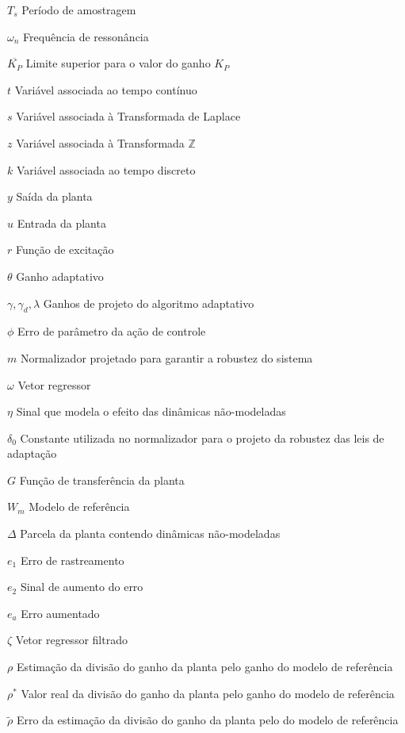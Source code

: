 \documentclass[12pt,
              openright,
              twoside,
              a4paper,
              english,
              french,
              spanish,
              sumario=tradicional,
              brazil
              ]{abntex2}
\begin{document}
\begin{simbolos}
 \item[$ T_s $] Período de amostragem
 \item[$ \omega_n $] Frequência de ressonância
 \item[$ \overline{K_P} $] Limite superior para o valor do ganho $K_P$
 \item[$ t $] Variável associada ao tempo contínuo
 \item[$ s $] Variável associada à Transformada de Laplace
 \item[$ z $] Variável associada à Transformada $\mathbb{Z}$
 \item[$ k $] Variável associada ao tempo discreto
 \item[$ y $] Saída da planta
 \item[$ u $] Entrada da planta
 \item[$ r $] Função de excitação
 \item[$ \theta $] Ganho adaptativo
 \item[$ \gamma, \gamma_d, \lambda $] Ganhos de projeto do algoritmo adaptativo
 \item[$ \phi $] Erro de parâmetro da ação de controle
 \item[$ m $] Normalizador projetado para garantir a robustez do sistema
 \item[$ \omega $] Vetor regressor
 \item[$ \eta $] Sinal que modela o efeito das dinâmicas não-modeladas
 \item[$ \delta_0 $] Constante utilizada no normalizador para o projeto da robustez das leis de adaptação
 \item[$ G $] Função de transferência da planta
 \item[$ W_m $] Modelo de referência
 \item[$ \Delta $] Parcela da planta contendo dinâmicas não-modeladas
 \item[$ e_1 $] Erro de rastreamento
 \item[$ e_2 $] Sinal de aumento do erro
 \item[$ e_a $] Erro aumentado
 \item[$ \zeta $] Vetor regressor filtrado
 \item[$ \rho $] Estimação da divisão do ganho da planta pelo ganho do modelo de referência
 \item[$ \rho^* $] Valor real da divisão do ganho da planta pelo ganho do modelo de referência
 \item[$ \tilde{\rho} $] Erro da estimação da divisão do ganho da planta pelo do modelo de referência

\end{simbolos}
\end{document}
